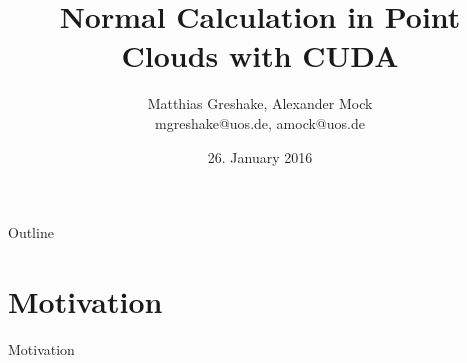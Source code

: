 \documentclass{beamer}
\begin{document}
\title{Normal Calculation in Point Clouds with CUDA}
\author[Matthias Greshake, Alexander Mock]{Matthias Greshake, Alexander Mock\\ {\scriptsize mgreshake@uos.de, amock@uos.de}}
\date{26. January 2016}

\begin{frame}[plain]
	\titlepage
\end{frame} 

\begin{frame}{Outline}
	\tableofcontents
\end{frame} 

\section{Motivation}
\begin{frame}{Motivation}
\end{frame}
\end{document}
